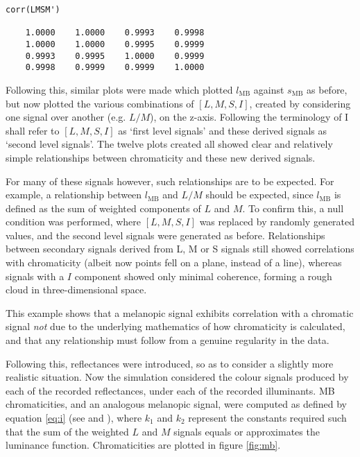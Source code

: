 \begin{minipage}{\linewidth}
\begin{lstlisting}
corr(LMSM')

    1.0000    1.0000    0.9993    0.9998
    1.0000    1.0000    0.9995    0.9999
    0.9993    0.9995    1.0000    0.9999
    0.9998    0.9999    0.9999    1.0000
\end{lstlisting}
\end{minipage}

Following this, similar plots were made which plotted $l_{\text{MB}}$ against $s_{\text{MB}}$ as before, but now plotted the various combinations of $[L,M,S,I]$, created by considering one signal over another (e.g. $L/M$), on the z-axis. Following the terminology of \citet{barrionuevo_contributions_2014} I shall refer to $[L,M,S,I]$ as `first level signals' and these derived signals as `second level signals'. The twelve plots created all showed clear and relatively simple relationships between chromaticity and these new derived signals.


For many of these signals however, such relationships are to be expected. For example, a relationship between $l_{\text{MB}}$ and $L/M$ should be expected, since $l_{\text{MB}}$ is defined as the sum of weighted components of $L$ and $M$. To confirm this, a null condition was performed, where $[L,M,S,I]$ was replaced by randomly generated values, and the second level signals were generated as before. Relationships between secondary signals derived from L, M or S signals still showed correlations with chromaticity (albeit now points fell on a plane, instead of a line), whereas signals with a $I$ component showed only minimal coherence, forming a rough cloud in three-dimensional space. 

This example shows that a melanopic signal exhibits correlation with a chromatic signal \emph{not} due to the underlying mathematics of how chromaticity is calculated, and that any relationship must follow from a genuine regularity in the data.

Following this, reflectances were introduced, so as to consider a slightly more realistic situation. Now the simulation considered the colour signals produced by each of the recorded reflectances, under each of the recorded illuminants. \gls{MB} chromaticities, and an analogous melanopic signal, were computed as defined by equation \ref{eq:i} (see \cite{macleod_chromaticity_1979} and \cite{cie_cie_2015}), where $k_1$ and $k_2$ represent the constants required such that the sum of the weighted $L$ and $M$ signals equals or approximates the luminance function. Chromaticities are plotted in figure \ref{fig:mb}.

